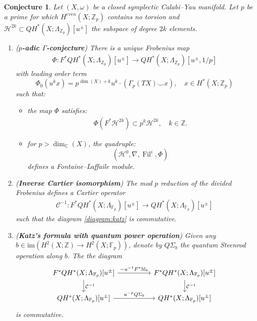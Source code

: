\documentclass[reqno]{amsart}
\numberwithin{equation}{section}
\numberwithin{equation}{section}
\numberwithin{equation}{section}
\newtheorem{conj}[thm]{Conjecture}
\theoremstyle{definition}
\theoremstyle{remark}
\theoremstyle{remark}
\begin{document}
\begin{conj}\label{conj:p-adic-gamma}
    Let $(X, \omega)$ be a closed symplectic Calabi--Yau manifold. Let $p$ be a prime for which $H^{even}(X;\mathbb{Z}_p)$ contains no torsion and $\mathcal{H}^{2k} \subset QH^*(X; \Lambda_{\mathbb{Z}_p})[u^{\pm}]$ the subspace of degree $2k$ elements.
    \begin{enumerate}
    \item (\textbf{$p$-adic $\Gamma$-conjecture})   There is a unique Frobenius map
    \begin{align} \Phi: F^*QH^*(X; \Lambda_{\mathbb{Z}_p})[u^{\pm}] \to QH^*(X; \Lambda_{\mathbb{Z}_p})[u^{\pm},1/p] \end{align} 
    with leading order term 
    \begin{equation}
        \Phi_0(u^kx) = p^{\dim(X)+k} u^k\cdot(\Gamma_p(TX) \smile x), \quad x \in H^*(X;\mathbb{Z}_p)
    \end{equation}
   such that: \begin{itemize} \item the map $\Phi$ satisfies:   \begin{align} \label{eq:keyintegralitycondition2} \Phi(F^*\mathcal{H}^{2k}) \subset p^k\mathcal{H}^{2k},\quad k \in \mathbb{Z}.\end{align} 
    \item for $p>\operatorname{dim}_{\mathbb{C}}(X)$, the quadruple: \begin{equation}(\mathcal{H}^0,\nabla,\operatorname{Fil}^i,\Phi)
    \end{equation}
    defines a Fontaine--Laffaile module. \end{itemize}
    \item (\textbf{Inverse Cartier isomorphism}) The mod $p$ reduction of the divided Frobenius defines a Cartier operator 
    \begin{align} 
    \mathcal{C}^{-1}: F^*QH^*(X;\Lambda_{\mathbb{F}_p})[u^{\pm}] \to QH^*(X;\Lambda_{\mathbb{F}_p})[u^{\pm}]
    \end{align}
    such that the diagram \eqref{diagram:katz} is commutative.
    \item (\textbf{Katz's formula with quantum power operation}) Given any $b \in \mathrm{im}(H^2(X;\mathbb{Z}) \to H^2(X;\mathbb{F}_p))$, denote by $Q\Sigma_b$ the quantum Steenrod operation along $b$. The the diagram
    \begin{equation}
        \begin{tikzcd}
             F^*QH^*(X;\Lambda_{\mathbb{F}_p})[u^{\pm}]  \arrow[rr, "-u^{-1}F^*\mathbb{M}_b"] \dar["\mathcal{C}^{-1}"] &&  F^*QH^*(X;\Lambda_{\mathbb{F}_p})[u^{\pm}]  \dar["\mathcal{C}^{-1}"] \\
             QH^*(X;\Lambda_{\mathbb{F}_p})[u^{\pm}] \arrow[rr, "u^{-p}Q\Sigma_b"] && QH^*(X;\Lambda_{\mathbb{F}_p})[u^{\pm}]
        \end{tikzcd}
    \end{equation}
    is commutative.
    \end{enumerate}
\end{conj}
\end{document}
